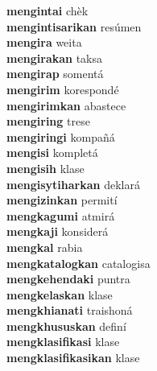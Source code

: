\textbf{mengintai } chèk \\
\textbf{mengintisarikan } resúmen \\
\textbf{mengira } weita \\
\textbf{mengirakan } taksa \\
\textbf{mengirap } somentá \\
\textbf{mengirim } korespondé \\
\textbf{mengirimkan } abastece \\
\textbf{mengiring } trese \\
\textbf{mengiringi } kompañá \\
\textbf{mengisi } kompletá \\
\textbf{mengisih } klase \\
\textbf{mengisytiharkan } deklará \\
\textbf{mengizinkan } permití \\
\textbf{mengkagumi } atmirá \\
\textbf{mengkaji } konsiderá \\
\textbf{mengkal } rabia \\
\textbf{mengkatalogkan } catalogisa \\
\textbf{mengkehendaki } puntra \\
\textbf{mengkelaskan } klase \\
\textbf{mengkhianati } traishoná \\
\textbf{mengkhususkan } definí \\
\textbf{mengklasifikasi } klase \\
\textbf{mengklasifikasikan } klase \\
